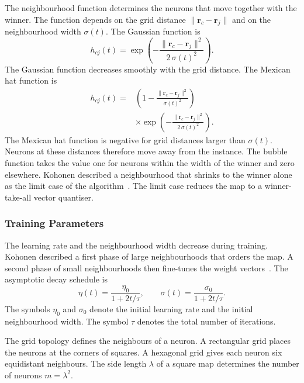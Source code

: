 \documentclass[conference]{IEEEtran}
\newcommand{\vect}[1]{\mathbf{#1}}
\begin{document}
The neighbourhood function determines the neurons that move together with the winner.
The function depends on the grid distance $\lVert \vect{r}_c - \vect{r}_j \rVert$ and on the neighbourhood width $\sigma(t)$.
The Gaussian function is
\begin{equation}
h_{cj}(t) = \exp\!\left( -\frac{\lVert \vect{r}_c - \vect{r}_j \rVert^{2}}{2\,\sigma(t)^{2}} \right) .
\label{eq:gaussian}
\end{equation}
The Gaussian function decreases smoothly with the grid distance.
The Mexican hat function is
\begin{equation}
\begin{split}
h_{cj}(t) = {} & \left( 1 - \frac{\lVert \vect{r}_c - \vect{r}_j \rVert^{2}}{\sigma(t)^{2}} \right) \\
& \times \exp\!\left( -\frac{\lVert \vect{r}_c - \vect{r}_j \rVert^{2}}{2\,\sigma(t)^{2}} \right) .
\end{split}
\label{eq:mexican}
\end{equation}
The Mexican hat function is negative for grid distances larger than $\sigma(t)$.
Neurons at these distances therefore move away from the instance.
The bubble function takes the value one for neurons within the width of the winner and zero elsewhere.
Kohonen described a neighbourhood that shrinks to the winner alone as the limit case of the algorithm~\cite{Kohonen2001}.
The limit case reduces the map to a winner-take-all vector quantiser.

\subsubsection{Training Parameters}

The learning rate and the neighbourhood width decrease during training.
Kohonen described a first phase of large neighbourhoods that orders the map.
A second phase of small neighbourhoods then fine-tunes the weight vectors~\cite{Kohonen2001}.
The asymptotic decay schedule is
\begin{equation}
\eta(t) = \frac{\eta_0}{1 + 2t/\tau} , \qquad \sigma(t) = \frac{\sigma_0}{1 + 2t/\tau} .
\label{eq:decay}
\end{equation}
The symbols $\eta_0$ and $\sigma_0$ denote the initial learning rate and the initial neighbourhood width.
The symbol $\tau$ denotes the total number of iterations.

The grid topology defines the neighbours of a neuron.
A rectangular grid places the neurons at the corners of squares.
A hexagonal grid gives each neuron six equidistant neighbours.
The side length $\lambda$ of a square map determines the number of neurons $m = \lambda^{2}$.
\end{document}
